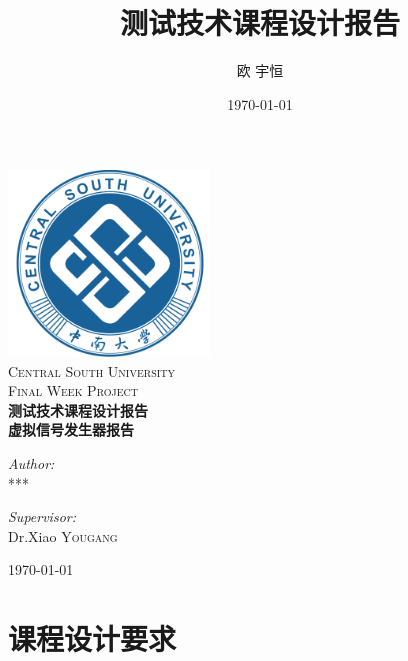 \documentclass[12pt]{ctexart}
\title{测试技术课程设计报告}
\author{欧 宇恒}
\date{\today}
\begin{document}
\begin{titlepage}

  \begin{center}
    \includegraphics[width=0.4\textwidth]{./CSU.png}\\[1cm]
    \textsc{\LARGE Central South University}\\[1.5cm]
    \textsc{\Large Final Week Project}\\[1.5cm]
    \textsc{\huge \bfseries 测试技术课程设计报告}\\[1cm]
    \textsc{ \bfseries 虚拟信号发生器报告}\\[1.5cm]
    \begin{minipage}{0.4\textwidth}
      \begin{flushleft} \large
        \emph{Author:}\\
        ***
      \end{flushleft}
    \end{minipage}
    \begin{minipage}{0.4\textwidth}
      \begin{flushright} \large
        \emph{Supervisor:} \\
        Dr.Xiao \textsc{Yougang}
      \end{flushright}
    \end{minipage}
    \vfill
    {\large \today}
  \end{center}
\end{titlepage}
\newpage
\tableofcontents
\newpage

\section{课程设计要求}
\end{document}

